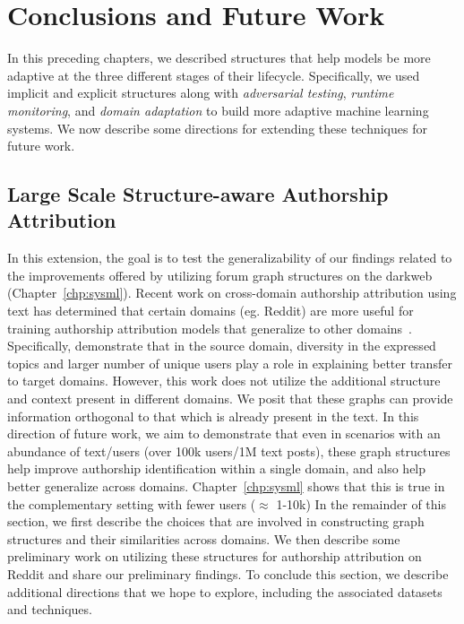 \chapter{Conclusions and Future Work}
\label{chp:future_work}

In this preceding chapters, we described structures that help models be more adaptive at the three different stages of their lifecycle.
Specifically, we used implicit and explicit structures along with \textit{adversarial testing}, \textit{runtime monitoring}, and \textit{domain adaptation} to build more adaptive machine learning systems.
We now describe some directions for extending these techniques for future work.


\section{Large Scale Structure-aware Authorship Attribution}
\label{sec:future_work:scale}
In this extension, the goal is to test the generalizability of our findings related to the improvements offered by utilizing forum graph structures on the darkweb (Chapter~\ref{chp:sysml}).
Recent work on cross-domain authorship attribution using text has determined that certain domains (eg. Reddit) are more useful for training authorship attribution models that generalize to other domains~\cite{barlas2020cross,riverastao2021learning}.
Specifically, \citet{riverastao2021learning} demonstrate that in the source domain, diversity in the expressed topics and larger number of unique users play a role in explaining better transfer to target domains.
However, this work does not utilize the additional structure and context present in different domains.
We posit that these graphs can provide information orthogonal to that which is already present in the text.
In this direction of future work, we aim to demonstrate that even in scenarios with an abundance of text/users (over 100k users/1M text posts), these graph structures help improve authorship identification within a single domain, and also help better generalize across domains.
Chapter~\ref{chp:sysml} shows that this is true in the complementary setting with fewer users ($\approx$ 1-10k)
In the remainder of this section, we first describe the choices that are involved in constructing graph structures and their similarities across domains. 
We then describe some preliminary work on utilizing these structures for authorship attribution on Reddit and share our preliminary findings.
To conclude this section, we describe additional directions that we hope to explore, including the associated datasets and techniques. %

